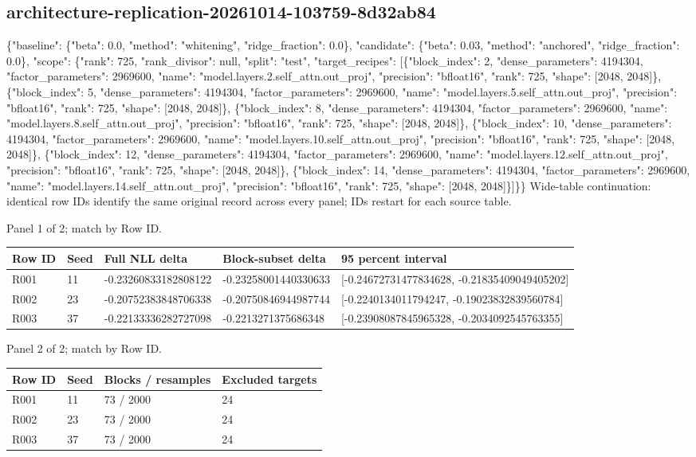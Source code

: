 \documentclass[10pt]{article}
\begin{document}
\subsection{architecture-replication-20261014-103759-8d32ab84}
\{"baseline": \{"beta": 0.0, "method": "whitening", "ridge\_fraction": 0.0\}, "candidate": \{"beta": 0.03, "method": "anchored", "ridge\_fraction": 0.0\}, "scope": \{"rank": 725, "rank\_divisor": null, "split": "test", "target\_recipes": [\{"block\_index": 2, "dense\_parameters": 4194304, "factor\_parameters": 2969600, "name": "model.layers.2.self\_attn.out\_proj", "precision": "bfloat16", "rank": 725, "shape": [2048, 2048]\}, \{"block\_index": 5, "dense\_parameters": 4194304, "factor\_parameters": 2969600, "name": "model.layers.5.self\_attn.out\_proj", "precision": "bfloat16", "rank": 725, "shape": [2048, 2048]\}, \{"block\_index": 8, "dense\_parameters": 4194304, "factor\_parameters": 2969600, "name": "model.layers.8.self\_attn.out\_proj", "precision": "bfloat16", "rank": 725, "shape": [2048, 2048]\}, \{"block\_index": 10, "dense\_parameters": 4194304, "factor\_parameters": 2969600, "name": "model.layers.10.self\_attn.out\_proj", "precision": "bfloat16", "rank": 725, "shape": [2048, 2048]\}, \{"block\_index": 12, "dense\_parameters": 4194304, "factor\_parameters": 2969600, "name": "model.layers.12.self\_attn.out\_proj", "precision": "bfloat16", "rank": 725, "shape": [2048, 2048]\}, \{"block\_index": 14, "dense\_parameters": 4194304, "factor\_parameters": 2969600, "name": "model.layers.14.self\_attn.out\_proj", "precision": "bfloat16", "rank": 725, "shape": [2048, 2048]\}]\}\}
Wide-table continuation: identical row IDs identify the same original record across every panel; IDs restart for each source table.
\par\noindent Panel 1 of 2; match by Row ID.
{\scriptsize\setlength{\tabcolsep}{2pt}
\begin{longtable}{p{}p{}p{}p{}p{}}
Row ID & Seed & Full NLL delta & Block-subset delta & 95 percent interval \\
\hline\endhead
R001 & 11 & -0.23260833182808122 & -0.23258001440330633 & [-0.24672731477834628, -0.21835409049405202] \\
R002 & 23 & -0.20752383848706338 & -0.20750846944987744 & [-0.2240134011794247, -0.19023832839560784] \\
R003 & 37 & -0.22133336282727098 & -0.2213271375686348 & [-0.23908087845965328, -0.2034092545763355] \\
\end{longtable}}
\par\noindent Panel 2 of 2; match by Row ID.
{\scriptsize\setlength{\tabcolsep}{2pt}
\begin{longtable}{p{}p{}p{}p{}}
Row ID & Seed & Blocks / resamples & Excluded targets \\
\hline\endhead
R001 & 11 & 73 / 2000 & 24 \\
R002 & 23 & 73 / 2000 & 24 \\
R003 & 37 & 73 / 2000 & 24 \\
\end{longtable}}
\end{document}

